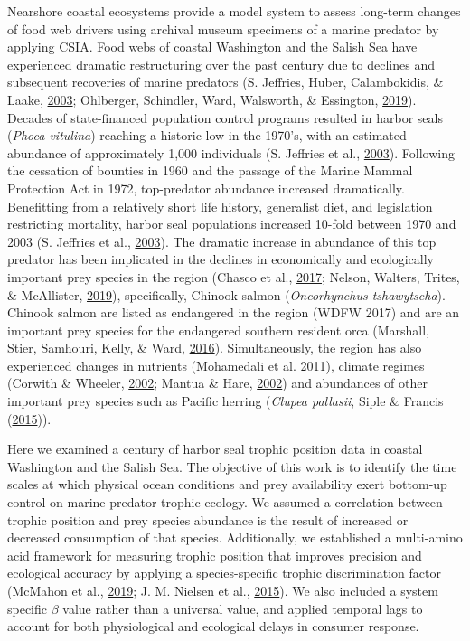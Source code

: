 \documentclass [11pt, proquest] {uwthesis}[2015/03/03]
\begin{document}
Nearshore coastal ecosystems provide a model system to assess long-term
changes of food web drivers using archival museum specimens of a marine
predator by applying CSIA. Food webs of coastal Washington and the
Salish Sea have experienced dramatic restructuring over the past century
due to declines and subsequent recoveries of marine predators (S.
Jeffries, Huber, Calambokidis, \& Laake,
\protect\hyperlink{ref-Jeffries2003}{2003}; Ohlberger, Schindler, Ward,
Walsworth, \& Essington, \protect\hyperlink{ref-Ohlberger2019}{2019}).
Decades of state-financed population control programs resulted in harbor
seals (\emph{Phoca vitulina}) reaching a historic low in the 1970's,
with an estimated abundance of approximately 1,000 individuals (S.
Jeffries et al., \protect\hyperlink{ref-Jeffries2003}{2003}). Following
the cessation of bounties in 1960 and the passage of the Marine Mammal
Protection Act in 1972, top-predator abundance increased dramatically.
Benefitting from a relatively short life history, generalist diet, and
legislation restricting mortality, harbor seal populations increased
10-fold between 1970 and 2003 (S. Jeffries et al.,
\protect\hyperlink{ref-Jeffries2003}{2003}). The dramatic increase in
abundance of this top predator has been implicated in the declines in
economically and ecologically important prey species in the region
(Chasco et al., \protect\hyperlink{ref-Chasco2017}{2017}; Nelson,
Walters, Trites, \& McAllister,
\protect\hyperlink{ref-Nelson2019}{2019}), specifically, Chinook salmon
(\emph{Oncorhynchus tshawytscha}). Chinook salmon are listed as
endangered in the region (WDFW 2017) and are an important prey species
for the endangered southern resident orca (Marshall, Stier, Samhouri,
Kelly, \& Ward, \protect\hyperlink{ref-Marshall2016}{2016}).
Simultaneously, the region has also experienced changes in nutrients
(Mohamedali et al. 2011), climate regimes (Corwith \& Wheeler,
\protect\hyperlink{ref-Corwith2002}{2002}; Mantua \& Hare,
\protect\hyperlink{ref-Mantua2002}{2002}) and abundances of other
important prey species such as Pacific herring (\emph{Clupea pallasii},
Siple \& Francis (\protect\hyperlink{ref-Siple2015}{2015})).

Here we examined a century of harbor seal trophic position data in
coastal Washington and the Salish Sea. The objective of this work is to
identify the time scales at which physical ocean conditions and prey
availability exert bottom-up control on marine predator trophic ecology.
We assumed a correlation between trophic position and prey species
abundance is the result of increased or decreased consumption of that
species. Additionally, we established a multi-amino acid framework for
measuring trophic position that improves precision and ecological
accuracy by applying a species-specific trophic discrimination factor
(McMahon et al., \protect\hyperlink{ref-McMahon2019}{2019}; J. M.
Nielsen et al., \protect\hyperlink{ref-Nielsen2015}{2015}). We also
included a system specific \(\beta\) value rather than a universal
value, and applied temporal lags to account for both physiological and
ecological delays in consumer response.
\end{document}
